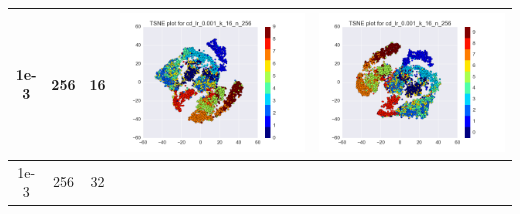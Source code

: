 \documentclass[12pt]{report}
\begin{document}
\begin{table}[H]
\begin{tabular}{ | c | c | c | c || c |}
        \\ \hline
    1e-3 & 256 & 16 &
    \begin{minipage}{.3\textwidth}
      \includegraphics[scale=0.25]{cd_lr_0_001_k_16_n_256.png}
    \end{minipage} &
    \begin{minipage}{.3\textwidth}
      \includegraphics[scale=0.25]{test_cd_lr_0_001_k_16_n_256.png}
    \end{minipage}
        \\ \hline
    1e-3 & 256 & 32 &
    \begin{minipage}{.3\textwidth}

\end{minipage}
\end{tabular}
\end{table}
\end{document}
